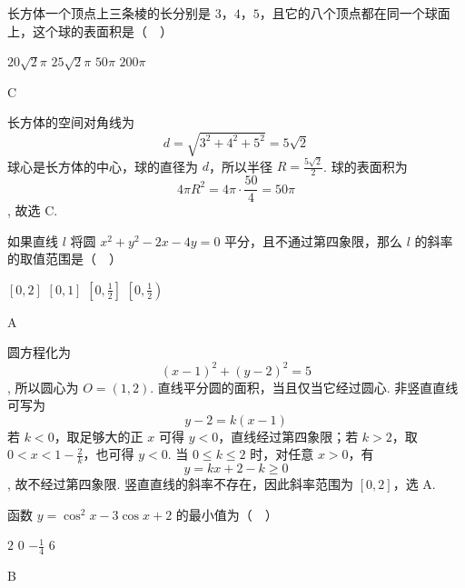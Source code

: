 \begin{problem}
长方体一个顶点上三条棱的长分别是 \(3\)，\(4\)，\(5\)，且它的八个顶点都在同一个球面上，这个球的表面积是（\(\quad\)）

\choices
    {\(20\sqrt{2}\pi\)}
    {\(25\sqrt{2}\pi\)}
    {\(50\pi\)}
    {\(200\pi\)}

\end{problem}

\begin{answer}
C
\end{answer}

\begin{solution}
长方体的空间对角线为
\[
d=\sqrt{3^2+4^2+5^2}=5\sqrt2
\]
球心是长方体的中心，球的直径为 \(d\)，所以半径 \(R=\frac{5\sqrt2}{2}\). 球的表面积为
\[
4\pi R^2=4\pi\cdot\frac{50}{4}=50\pi
\],
故选 C.
\end{solution}

\begin{problem}
如果直线 \(l\) 将圆 \(x^{2} + y^{2} - 2x - 4y = 0\) 平分，且不通过第四象限，那么 \(l\) 的斜率的取值范围是（\(\quad\)）

\choices
    {\([0,2]\)}
    {\([0,1]\)}
    {\(\left[0, \frac{1}{2}\right]\)}
    {\(\left[0, \frac{1}{2}\right)\)}

\end{problem}

\begin{answer}
A
\end{answer}

\begin{solution}
圆方程化为
\[
(x-1)^2+(y-2)^2=5
\],
所以圆心为 \(O=(1,2)\). 直线平分圆的面积，当且仅当它经过圆心. 非竖直直线可写为
\[
y-2=k(x-1)
\]
若 \(k<0\)，取足够大的正 \(x\) 可得 \(y<0\)，直线经过第四象限；若 \(k>2\)，取 \(0<x<1-\frac2k\)，也可得 \(y<0\). 当 \(0\leqslant k\leqslant2\) 时，对任意 \(x>0\)，有
\[
y=kx+2-k\geqslant0
\],
故不经过第四象限. 竖直直线的斜率不存在，因此斜率范围为 \([0,2]\)，选 A.
\end{solution}

\begin{problem}
函数 \(y = \cos^2 x - 3\cos x + 2\) 的最小值为（\(\quad\)）

\choices
    {\(2\)}
    {\(0\)}
    {\(-\frac{1}{4}\)}
    {\(6\)}

\end{problem}

\begin{answer}
B
\end{answer}


